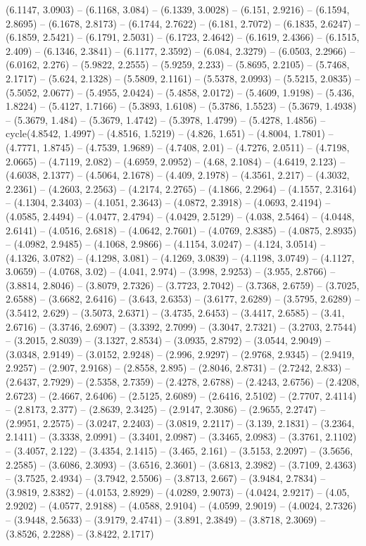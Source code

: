 (6.1147, 3.0903) -- (6.1168, 3.084) -- (6.1339, 3.0028) -- (6.151, 2.9216) -- (6.1594, 2.8695) -- (6.1678, 2.8173) -- (6.1744, 2.7622) -- (6.181, 2.7072) -- (6.1835, 2.6247) -- (6.1859, 2.5421) -- (6.1791, 2.5031) -- (6.1723, 2.4642) -- (6.1619, 2.4366) -- (6.1515, 2.409) -- (6.1346, 2.3841) -- (6.1177, 2.3592) -- (6.084, 2.3279) -- (6.0503, 2.2966) -- (6.0162, 2.276) -- (5.9822, 2.2555) -- (5.9259, 2.233) -- (5.8695, 2.2105) -- (5.7468, 2.1717) -- (5.624, 2.1328) -- (5.5809, 2.1161) -- (5.5378, 2.0993) -- (5.5215, 2.0835) -- (5.5052, 2.0677) -- (5.4955, 2.0424) -- (5.4858, 2.0172) -- (5.4609, 1.9198) -- (5.436, 1.8224) -- (5.4127, 1.7166) -- (5.3893, 1.6108) -- (5.3786, 1.5523) -- (5.3679, 1.4938) -- (5.3679, 1.484) -- (5.3679, 1.4742) -- (5.3978, 1.4799) -- (5.4278, 1.4856) -- cycle(4.8542, 1.4997) -- (4.8516, 1.5219) -- (4.826, 1.651) -- (4.8004, 1.7801) -- (4.7771, 1.8745) -- (4.7539, 1.9689) -- (4.7408, 2.01) -- (4.7276, 2.0511) -- (4.7198, 2.0665) -- (4.7119, 2.082) -- (4.6959, 2.0952) -- (4.68, 2.1084) -- (4.6419, 2.123) -- (4.6038, 2.1377) -- (4.5064, 2.1678) -- (4.409, 2.1978) -- (4.3561, 2.217) -- (4.3032, 2.2361) -- (4.2603, 2.2563) -- (4.2174, 2.2765) -- (4.1866, 2.2964) -- (4.1557, 2.3164) -- (4.1304, 2.3403) -- (4.1051, 2.3643) -- (4.0872, 2.3918) -- (4.0693, 2.4194) -- (4.0585, 2.4494) -- (4.0477, 2.4794) -- (4.0429, 2.5129) -- (4.038, 2.5464) -- (4.0448, 2.6141) -- (4.0516, 2.6818) -- (4.0642, 2.7601) -- (4.0769, 2.8385) -- (4.0875, 2.8935) -- (4.0982, 2.9485) -- (4.1068, 2.9866) -- (4.1154, 3.0247) -- (4.124, 3.0514) -- (4.1326, 3.0782) -- (4.1298, 3.081) -- (4.1269, 3.0839) -- (4.1198, 3.0749) -- (4.1127, 3.0659) -- (4.0768, 3.02) -- (4.041, 2.974) -- (3.998, 2.9253) -- (3.955, 2.8766) -- (3.8814, 2.8046) -- (3.8079, 2.7326) -- (3.7723, 2.7042) -- (3.7368, 2.6759) -- (3.7025, 2.6588) -- (3.6682, 2.6416) -- (3.643, 2.6353) -- (3.6177, 2.6289) -- (3.5795, 2.6289) -- (3.5412, 2.629) -- (3.5073, 2.6371) -- (3.4735, 2.6453) -- (3.4417, 2.6585) -- (3.41, 2.6716) -- (3.3746, 2.6907) -- (3.3392, 2.7099) -- (3.3047, 2.7321) -- (3.2703, 2.7544) -- (3.2015, 2.8039) -- (3.1327, 2.8534) -- (3.0935, 2.8792) -- (3.0544, 2.9049) -- (3.0348, 2.9149) -- (3.0152, 2.9248) -- (2.996, 2.9297) -- (2.9768, 2.9345) -- (2.9419, 2.9257) -- (2.907, 2.9168) -- (2.8558, 2.895) -- (2.8046, 2.8731) -- (2.7242, 2.833) -- (2.6437, 2.7929) -- (2.5358, 2.7359) -- (2.4278, 2.6788) -- (2.4243, 2.6756) -- (2.4208, 2.6723) -- (2.4667, 2.6406) -- (2.5125, 2.6089) -- (2.6416, 2.5102) -- (2.7707, 2.4114) -- (2.8173, 2.377) -- (2.8639, 2.3425) -- (2.9147, 2.3086) -- (2.9655, 2.2747) -- (2.9951, 2.2575) -- (3.0247, 2.2403) -- (3.0819, 2.2117) -- (3.139, 2.1831) -- (3.2364, 2.1411) -- (3.3338, 2.0991) -- (3.3401, 2.0987) -- (3.3465, 2.0983) -- (3.3761, 2.1102) -- (3.4057, 2.122) -- (3.4354, 2.1415) -- (3.465, 2.161) -- (3.5153, 2.2097) -- (3.5656, 2.2585) -- (3.6086, 2.3093) -- (3.6516, 2.3601) -- (3.6813, 2.3982) -- (3.7109, 2.4363) -- (3.7525, 2.4934) -- (3.7942, 2.5506) -- (3.8713, 2.667) -- (3.9484, 2.7834) -- (3.9819, 2.8382) -- (4.0153, 2.8929) -- (4.0289, 2.9073) -- (4.0424, 2.9217) -- (4.05, 2.9202) -- (4.0577, 2.9188) -- (4.0588, 2.9104) -- (4.0599, 2.9019) -- (4.0024, 2.7326) -- (3.9448, 2.5633) -- (3.9179, 2.4741) -- (3.891, 2.3849) -- (3.8718, 2.3069) -- (3.8526, 2.2288) -- (3.8422, 2.1717) 